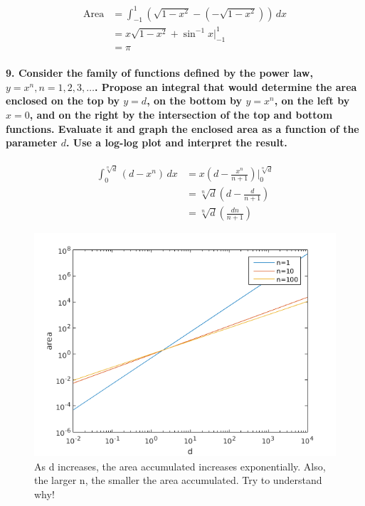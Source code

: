 \documentclass{article}
\begin{document}
\begin{align*}
    \mathrm{Area} &= \int_{-1}^1 \left(\sqrt{1 - x^2} - \left(-\sqrt{1 - x^2}\right)\right) \, dx\\
    &= x\sqrt{1-x^2} + \sin^{-1}x\Bigr|_{-1}^1 \\
    &= \pi
\end{align*}

\paragraph{9. Consider the family of functions defined by the power law, $y = x^n, n = 1,2,3,\ldots$. Propose an integral that would determine the area enclosed on the top by $y=d$, on the bottom by $y = x^n$, on the left by $x=0$, and on the right by the intersection of the top and bottom functions. Evaluate it and graph the enclosed area as a function of the parameter $d$. Use a log-log plot and interpret the result.}

\begin{align*}
    \int_0^{\sqrt[n]{d}} \left(d - x^n \right) \, dx &= x\left(d - \frac{x^n}{n+1}\right) \Bigr|_0^{\sqrt[n]{d}} \\
    &= \sqrt[n]{d}\left(d - \frac{d}{n+1}\right) \\
    &= \sqrt[n]{d}\left(\frac{dn}{n+1}\right)
\end{align*}



\begin{figure}[H]
    \centering
    \includegraphics[width=0.75\columnwidth]{power.png}
    \caption{As d increases, the area accumulated increases exponentially. Also, the larger n, the smaller the area accumulated. Try to understand why!}
\end{figure}
\end{document}
